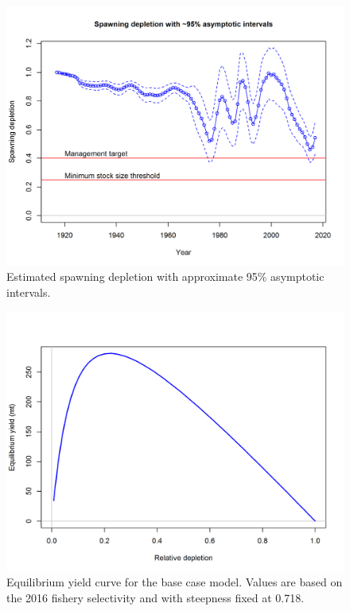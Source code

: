\documentclass[12pt,]{article}
\begin{document}
\begin{figure}[htbp]
\centering
\includegraphics{r4ss/plots_mod1/ts9_Spawning_depletion_with_95_asymptotic_intervals_intervals.png}
\caption{Estimated spawning depletion with approximate 95\% asymptotic
intervals.
\label{fig:ts9_Spawning_depletion_with_95_asymptotic_intervals_intervals}}
\end{figure}

\begin{figure}[htbp]
\centering
\includegraphics{r4ss/plots_mod1/yield1_yield_curve.png}
\caption{Equilibrium yield curve for the base case model. Values are
based on the 2016 fishery selectivity and with steepness fixed at 0.718.
\label{fig:yield1_yield_curve}}
\end{figure}
\end{document}
